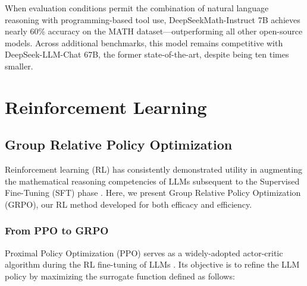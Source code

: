 When evaluation conditions permit the combination of natural language reasoning with programming-based tool use, DeepSeekMath-Instruct 7B achieves nearly 60\% accuracy on the MATH dataset—outperforming all other open-source models. Across additional benchmarks, this model remains competitive with DeepSeek-LLM-Chat 67B, the former state-of-the-art, despite being ten times smaller.

\section{Reinforcement Learning}

\subsection{Group Relative Policy Optimization} Reinforcement learning (RL) has consistently demonstrated utility in augmenting the mathematical reasoning competencies of LLMs subsequent to the Supervised Fine-Tuning (SFT) phase \citep{wang2023math,wizardmath}. Here, we present Group Relative Policy Optimization (GRPO), our RL method developed for both efficacy and efficiency.

\subsubsection{From PPO to GRPO} Proximal Policy Optimization (PPO) \citep{schulman2017proximal} serves as a widely-adopted actor-critic algorithm during the RL fine-tuning of LLMs \citep{ouyang2022training}. Its objective is to refine the LLM policy by maximizing the surrogate function defined as follows:

